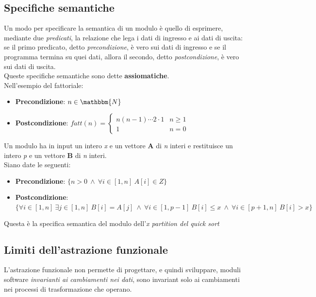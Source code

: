 \documentclass[12pt]{report}
\newcounter{exercise}
\begin{document}
	\subsection{Specifiche semantiche}
	Un modo per specificare la semantica di un modulo è quello di esprimere, mediante due \textit{predicati}, la relazione che lega i dati di ingresso e ai dati di uscita: se il primo predicato, detto \textit{precondizione}, è vero sui dati di ingresso e se il programma termina su quei dati, allora il secondo, detto \textit{postcondizione}, è vero sui dati di uscita. \\
	Queste specifiche semantiche sono dette \textbf{assiomatiche}. \\
	Nell'esempio del fattoriale:
	\begin{itemize}
		\item \textbf{Precondizione}: $n \in \mathbbm{N}$
		\item \textbf{Postcondizione}: $fatt(n) = \begin{cases}
			n(n-1)\cdots 2 \cdot 1 & n \geq 1\\
			1 & n = 0
		\end{cases}$
	\end{itemize}
	\begin{exercise}{}{}
		Un modulo ha in input un intero \textit{x} e un vettore \textbf{A} di \textit{n} interi e restituisce un intero \textit{p} e un vettore \textbf{B} di \textit{n} interi. \\
		Siano date le seguenti:
		\begin{itemize}
			\item \textbf{Precondizione}: $\{n > 0\ \wedge\ \forall i \in [1, n]\ A[i] \in Z\}$
			\item \textbf{Postcondizione}: $\{\forall i \in [1, n]\ \exists j \in [1, n]\ B[i] = A[j]\ \wedge\ \forall i \in [1, p-1]\ B[i] \leq x\ \wedge\ \forall i \in [p + 1, n]\ B[i] > x\}$
		\end{itemize}
		Questa è la specifica semantica del modulo dell'\textit{x partition del quick sort}
	\end{exercise}
	\subsection{Limiti dell'astrazione funzionale}
	L'astrazione funzionale non permette di progettare, e quindi sviluppare, moduli software \textit{invarianti ai cambiamenti nei dati}, sono invariant solo ai cambiamenti nei processi di trasformazione che operano.
\end{document}
